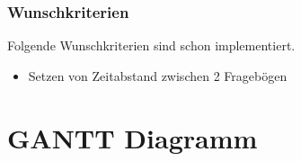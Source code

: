 \documentclass[a4paper]{scrreprt}
\begin{document}
                \subsection{Wunschkriterien}
                \par
                Folgende Wunschkriterien sind schon implementiert.
                        \begin{itemize}
                            \item Setzen von Zeitabstand zwischen 2 Frageb\"ogen
                        \end{itemize}
                        \vspace*{0.5cm}


           \newpage
    \chapter{GANTT Diagramm}
\end{document}
